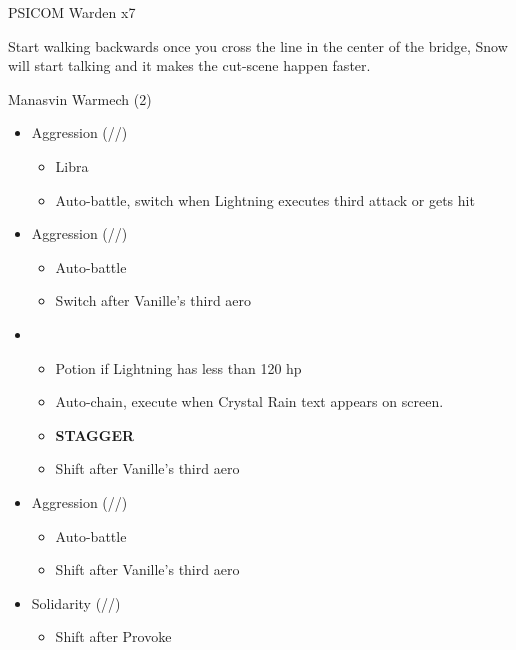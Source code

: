 \begin{multicols}{2}
\renewcommand{\second}{[2] Solidarity (\com/\sen/\med)}

\renewcommand{\third}{[3] Aggression (\com/\com/\rav)}

\renewcommand{\fourth}{[4] Aggression (\com/\com/\rav)}

\begin{battle}{PSICOM Warden x7}
 
\end{battle}

Start walking backwards once you cross the line in the center of the bridge, Snow will start talking and it makes the cut-scene happen faster.
\vfill

\begin{battle}{Manasvin Warmech (2)}
\begin{itemize}
    \item \third
    \begin{itemize}
        \item Libra
        \item Auto-battle, switch when Lightning executes third attack or gets hit
    \end{itemize}
    \item \fourth
    \begin{itemize}
        \item Auto-battle
        \item Switch after Vanille's third aero
    \end{itemize}
    \item \first
    \begin{itemize}
        \item Potion if Lightning has less than 120 hp
        \item Auto-chain, execute when Crystal Rain text appears on screen.
        \item \textbf{STAGGER}
        \item Shift after Vanille's third aero
    \end{itemize}
    \item \third
    \begin{itemize}
        \item Auto-battle
        \item Shift after Vanille's third aero
    \end{itemize}
    \item \second
    \begin{itemize}
        \item Shift after Provoke
    \end{itemize}

\end{itemize}
\end{battle}
\end{multicols}
